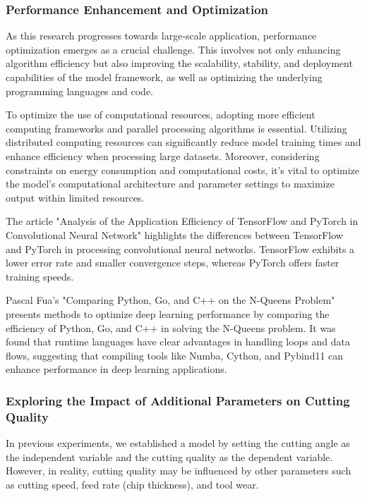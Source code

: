 

\subsubsection{Performance Enhancement and Optimization}

As this research progresses towards large-scale application, performance optimization emerges as a crucial challenge. This involves not only enhancing algorithm efficiency but also improving the scalability, stability, and deployment capabilities of the model framework, as well as optimizing the underlying programming languages and code.

To optimize the use of computational resources, adopting more efficient computing frameworks and parallel processing algorithms is essential. Utilizing distributed computing resources can significantly reduce model training times and enhance efficiency when processing large datasets. Moreover, considering constraints on energy consumption and computational costs, it's vital to optimize the model's computational architecture and parameter settings to maximize output within limited resources.

The article "Analysis of the Application Efficiency of TensorFlow and PyTorch in Convolutional Neural Network" highlights the differences between TensorFlow and PyTorch in processing convolutional neural networks\cite{6.2}. TensorFlow exhibits a lower error rate and smaller convergence steps, whereas PyTorch offers faster training speeds.

Pascal Fua's "Comparing Python, Go, and C++ on the N-Queens Problem" presents methods to optimize deep learning performance by comparing the efficiency of Python, Go, and C++ in solving the N-Queens problem.\cite{6.3} It was found that runtime languages have clear advantages in handling loops and data flows, suggesting that compiling tools like Numba, Cython, and Pybind11 can enhance performance in deep learning applications.




\subsubsection{Exploring the Impact of Additional Parameters on Cutting Quality}

In previous experiments, we established a model by setting the cutting angle as the independent variable and the cutting quality as the dependent variable. However, in reality, cutting quality may be influenced by other parameters such as cutting speed, feed rate (chip thickness), and tool wear.

